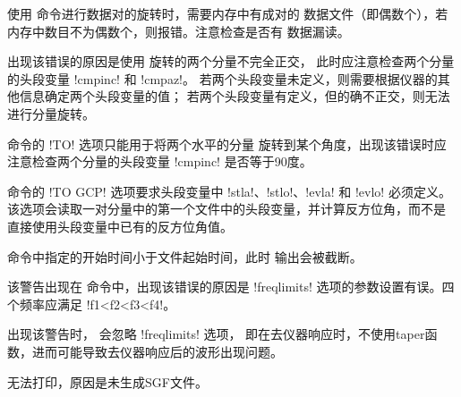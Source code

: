 使用  命令进行数据对的旋转时，需要内存中有成对的
数据文件（即偶数个），若内存中数目不为偶数个，则报错。注意检查是否有
数据漏读。

出现该错误的原因是使用  旋转的两个分量不完全正交，
此时应注意检查两个分量的头段变量 !cmpinc! 和 !cmpaz!。
若两个头段变量未定义，则需要根据仪器的其他信息确定两个头段变量的值；
若两个头段变量有定义，但的确不正交，则无法进行分量旋转。

 命令的 !TO! 选项只能用于将两个水平的分量
旋转到某个角度，出现该错误时应注意检查两个分量的头段变量 !cmpinc!
是否等于90度。

 命令的 !TO GCP! 选项要求头段变量中
!stla!、!stlo!、!evla! 和 !evlo! 必须定义。
该选项会读取一对分量中的第一个文件中的头段变量，并计算反方位角，而不是
直接使用头段变量中已有的反方位角值。

 命令中指定的开始时间小于文件起始时间，此时
输出会被截断。

该警告出现在  命令中，出现该错误的原因是 !freqlimits!
选项的参数设置有误。四个频率应满足 !f1<f2<f3<f4!。

出现该警告时， 会忽略 !freqlimits! 选项，
即在去仪器响应时，不使用taper函数，进而可能导致去仪器响应后的波形出现问题。

无法打印，原因是未生成SGF文件。
